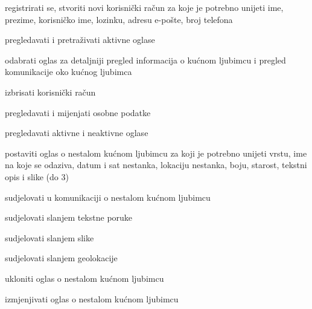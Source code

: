 \begin{packed_enum}
	\item  {}
	
	\begin{packed_enum}
		
		\item registrirati se, stvoriti novi korisnički račun za koje je potrebno unijeti ime, prezime, korisničko ime, lozinku, adresu e-pošte, broj telefona
		\item pregledavati i pretraživati aktivne oglase
		\item odabrati oglas za detaljniji pregled informacija o kućnom ljubimcu i pregled komunikacije oko kućnog ljubimca
		
		
	\end{packed_enum}
	
	\item  {}
	
	\begin{packed_enum}
		
		\item izbrisati korisnički račun
		\item pregledavati i mijenjati osobne podatke
		\item pregledavati aktivne i neaktivne oglase
		\item postaviti oglas o nestalom kućnom ljubimcu za koji je potrebno unijeti vrstu, ime na koje se odaziva, datum i sat nestanka, lokaciju nestanka, boju, starost, tekstni opis i slike (do 3)
		\item sudjelovati u komunikaciji o nestalom kućnom ljubimcu
		\begin{packed_enum}
			
			\item sudjelovati slanjem tekstne poruke
			\item sudjelovati slanjem slike
			\item sudjelovati slanjem geolokacije
			
		\end{packed_enum}
		\item ukloniti oglas o nestalom kućnom ljubimcu
		\item izmjenjivati oglas o nestalom kućnom ljubimcu
		
		
	\end{packed_enum}
	
	\item  {}
	

\end{packed_enum}
